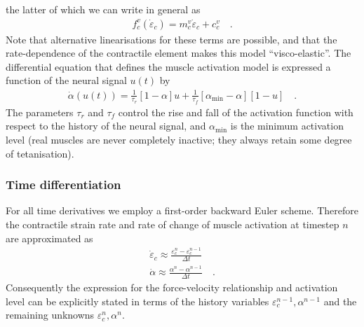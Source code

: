 \documentclass[]{scrartcl}
\begin{document}
the latter of which we can write in general as
\begin{gather}
f_{c}^{v} \left( \dot{\varepsilon}_{c} \right)
  = m_{c}^{v} \dot{\varepsilon}_{c} + c_{c}^{v}
\quad .
\end{gather}
Note that alternative linearisations for these terms are possible, and that the rate-dependence of the contractile element makes this model ``visco-elastic''.
The differential equation that defines the muscle activation model \citep{Pandy1990a} is expressed a function of the neural signal $u \left( t \right)$ by
\begin{gather}
\dot{\alpha}\left( u \left( t \right) \right)
  =\frac{1}{\tau_{r}} \left[ 1 - \alpha \right] u + \frac{1}{\tau_{f}} \left[ \alpha_{\min} - \alpha \right] \left[ 1- u \right]
\quad .
\end{gather}
The parameters $\tau_{r}$ and $\tau_{f}$ control the rise and fall of the activation function with respect to the history of the neural signal, and $\alpha_{\min}$ is the minimum activation level (real muscles are never completely inactive; they always retain some degree of tetanisation).

\subsubsection*{Time differentiation}
For all time derivatives we employ a first-order backward Euler scheme.
Therefore the contractile strain rate and rate of change of muscle activation at timestep $n$ are approximated as
\begin{gather}
\dot{\varepsilon}_{c}
  \approx \frac{\varepsilon_{c}^{n} - \varepsilon_{c}^{n-1}}{\Delta t}
\\
\dot{\alpha}
  \approx \frac{{\alpha}^{n} - \alpha^{n-1}}{\Delta t}
\quad .
\end{gather}
Consequently the expression for the force-velocity relationship and activation level can be explicitly stated in terms of the history variables $\varepsilon_{c}^{n-1},\alpha^{n-1}$ and the remaining unknowns $\varepsilon_{c}^{n},\alpha^{n}$.
\end{document}
